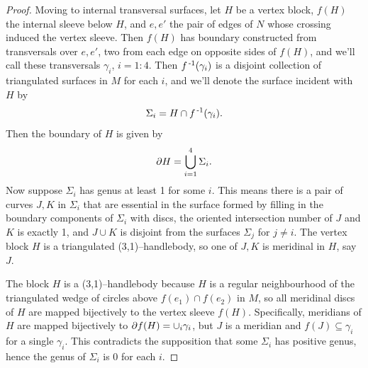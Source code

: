 \begin{proof}
	Moving to internal transversal surfaces,
	let $H$ be a vertex block, $f(H)$ the internal sleeve below $H$, and $e,e'$ the pair of edges of $N$ whose crossing induced the vertex sleeve.
	Then $f(H)$ has boundary constructed from transversals over $e,e'$, two from each edge on opposite sides of $f(H)$, and we'll call these transversals $\gamma_i$, $i=1:4$.
	Then $f^{\,\text{-}1}(\gamma_i)$ is a disjoint collection of triangulated surfaces in $M$ for each $i$, and we'll denote the surface incident with $H$ by
	\[
		\Sigma_i = H\cap f^{\,\text{-}1}(\gamma_i).
	\]
	Then the boundary of $H$ is given by
	\[
		\partial H = \bigcup_{i=1}^4 \Sigma_i.
	\]
	Now suppose $\Sigma_i$ has genus at least 1 for some $i$.
	This means there is a pair of curves $J,K$ in $\Sigma_i$ that are essential in the surface formed by filling in the boundary components of $\Sigma_i$ with discs, the oriented intersection number of $J$ and $K$ is exactly 1, and $J\cup K$ is disjoint from the surfaces $\Sigma_j$ for $j\neq i$.
	The vertex block $H$ is a triangulated (3,1)--handlebody, so one of $J,K$ is meridinal in $H$, say $J$.
	
	The block $H$ is a (3,1)--handlebody because $H$ is a regular neighbourhood of the triangulated wedge of circles above $f(e_1)\cap f(e_2)$ in $M$, so all meridinal discs of $H$ are mapped bijectively to the vertex sleeve $f(H)$.
	Specifically, meridians of $H$ are mapped bijectively to $\partial f(H) = \cup_i\gamma_i$, but $J$ is a meridian and $f(J)\subseteq \gamma_i$ for a single $\gamma_i$.
	This contradicts the supposition that some $\Sigma_i$ has positive genus, hence the genus of $\Sigma_i$ is 0 for each $i$.
\end{proof}

%
%
%

%




